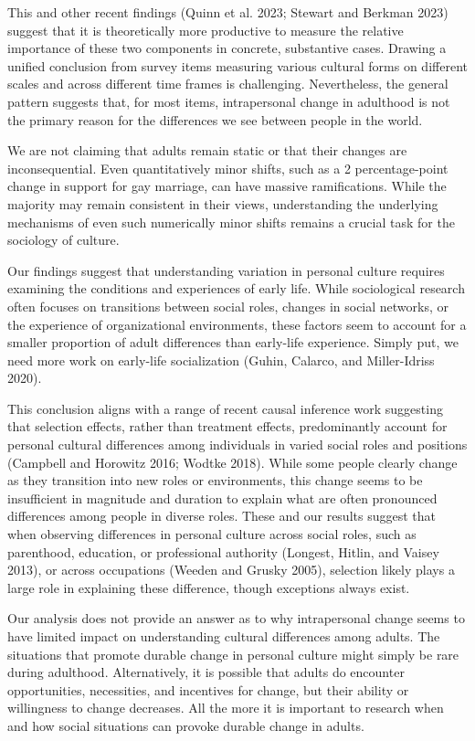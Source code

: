 \documentclass[
  12pt,
]{article}
\begin{document}
This and other recent findings (Quinn et al. 2023; Stewart and Berkman
2023) suggest that it is theoretically more productive to measure the
relative importance of these two components in concrete, substantive
cases. Drawing a unified conclusion from survey items measuring various
cultural forms on different scales and across different time frames is
challenging. Nevertheless, the general pattern suggests that, for most
items, intrapersonal change in adulthood is not the primary reason for
the differences we see between people in the world.

We are not claiming that adults remain static or that their changes are
inconsequential. Even quantitatively minor shifts, such as a 2
percentage-point change in support for gay marriage, can have massive
ramifications. While the majority may remain consistent in their views,
understanding the underlying mechanisms of even such numerically minor
shifts remains a crucial task for the sociology of culture.

Our findings suggest that understanding variation in personal culture
requires examining the conditions and experiences of early life. While
sociological research often focuses on transitions between social roles,
changes in social networks, or the experience of organizational
environments, these factors seem to account for a smaller proportion of
adult differences than early-life experience. Simply put, we need more
work on early-life socialization (Guhin, Calarco, and Miller-Idriss
2020).

This conclusion aligns with a range of recent causal inference work
suggesting that selection effects, rather than treatment effects,
predominantly account for personal cultural differences among
individuals in varied social roles and positions (Campbell and Horowitz
2016; Wodtke 2018). While some people clearly change as they transition
into new roles or environments, this change seems to be insufficient in
magnitude and duration to explain what are often pronounced differences
among people in diverse roles. These and our results suggest that when
observing differences in personal culture across social roles, such as
parenthood, education, or professional authority (Longest, Hitlin, and
Vaisey 2013), or across occupations (Weeden and Grusky 2005), selection
likely plays a large role in explaining these difference, though
exceptions always exist.

Our analysis does not provide an answer as to why intrapersonal change
seems to have limited impact on understanding cultural differences among
adults. The situations that promote durable change in personal culture
might simply be rare during adulthood. Alternatively, it is possible
that adults do encounter opportunities, necessities, and incentives for
change, but their ability or willingness to change decreases. All the
more it is important to research when and how social situations can
provoke durable change in adults.
\end{document}
